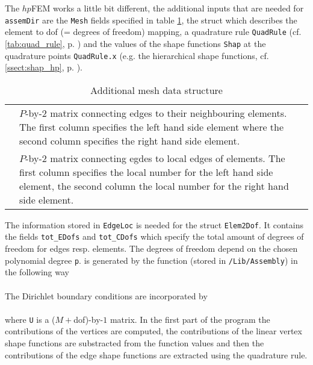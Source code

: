 The $hp$FEM works a little bit different, the additional inputs that are needed for {\tt assemDir} are the {\tt Mesh} fields specified in table \ref{tab:dir_hp}, the struct  which describes the element to dof (= degrees of freedom) mapping, a quadrature rule {\tt QuadRule} (cf. \ref{tab:quad_rule}, p. \pageref{tab:quad_rule}) and the values of the shape functions {\tt Shap} at the quadrature points {\tt QuadRule.x} (e.g. the hierarchical shape functions, cf. \ref{ssect:shap_hp}, p. \pageref{ssect:shap_hp}).

\begin{table}[htb]
  \begin{tabular}{p{2cm}p{9cm}}
	\ttindex{Edge2Elem} & {\small $P$-by-$2$ matrix connecting edges to their neighbouring elements. The first column specifies the left hand side element where the second column specifies the right hand side element.} \\
    	\ttindex{EdgeLoc} & {\small $P$-by-$2$ matrix connecting egdes to local edges of elements. The first column specifies the local number for the left hand side element, the second column the local number for the right hand side element.}
  \end{tabular}
  \caption{Additional mesh data structure}
  \label{tab:dir_hp}
\end{table}

 The information stored in {\tt EdgeLoc} is needed for the struct {\tt Elem2Dof}. It contains the fields {\tt tot\_EDofs} and {\tt tot\_CDofs} which specify the total amount of degrees of freedom for edges resp. elements. The degrees of freedom depend on the chosen polynomial degree {\tt p}.  is generated by the function  (stored in {\tt /Lib/Assembly}) in the following way \\

 \\

 The Dirichlet boundary conditions are incorporated by \\

 \\

 where {\tt U} is a ($M+$dof)-by-$1$ matrix. In the first part of the program the contributions of the vertices are computed, the contributions of the linear vertex shape functions are substracted from the function values and then the contributions of the edge shape functions are extracted using the quadrature rule. \\

